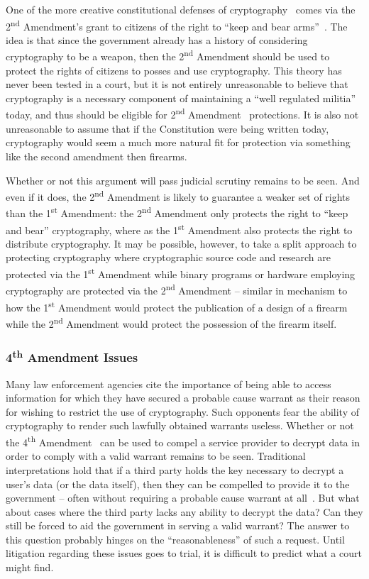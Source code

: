 One of the more creative constitutional defenses of
cryptography~\cite{xkcd-504} comes via the 2\textsuperscript{nd}
Amendment's grant to citizens of the right to ``keep and bear
arms''~\cite{us-constitution-amend2}. The idea is that since the
government already has a history of considering cryptography to be a
weapon, then the 2\textsuperscript{nd} Amendment should be used to
protect the rights of citizens to posses and use cryptography. This
theory has never been tested in a court, but it is not entirely
unreasonable to believe that cryptography is a necessary component of
maintaining a ``well regulated militia'' today, and thus should be
eligible for 2\textsuperscript{nd}
Amendment~\cite{scotus-usvmiller-guns} protections. It is also not
unreasonable to assume that if the Constitution were being written
today, cryptography would seem a much more natural fit for protection
via something like the second amendment then firearms.

Whether or not this argument will pass judicial scrutiny remains to be
seen. And even if it does, the 2\textsuperscript{nd} Amendment is
likely to guarantee a weaker set of rights than the
1\textsuperscript{st} Amendment: the 2\textsuperscript{nd} Amendment
only protects the right to ``keep and bear'' cryptography, where as
the 1\textsuperscript{st} Amendment also protects the right to
distribute cryptography. It may be possible, however, to take a split
approach to protecting cryptography where cryptographic source code
and research are protected via the 1\textsuperscript{st} Amendment
while binary programs or hardware employing cryptography are protected
via the 2\textsuperscript{nd} Amendment -- similar in mechanism to how
the 1\textsuperscript{st} Amendment would protect the publication of a
design of a firearm while the 2\textsuperscript{nd} Amendment would
protect the possession of the firearm itself.

\subsubsection{4\textsuperscript{th} Amendment Issues}

Many law enforcement agencies cite the importance of being able to
access information for which they have secured a probable cause
warrant as their reason for wishing to restrict the use of
cryptography. Such opponents fear the ability of cryptography to
render such lawfully obtained warrants useless. Whether or not the
4\textsuperscript{th} Amendment~\cite{us-constitution-amend4} can be
used to compel a service provider to decrypt data in order to comply
with a valid warrant remains to be seen. Traditional interpretations
hold that if a third party holds the key necessary to decrypt a user's
data (or the data itself), then they can be compelled to provide it to
the government -- often without requiring a probable cause warrant at
all~\cite{thompson-thirdparty}. But what about cases where the third
party lacks any ability to decrypt the data? Can they still be forced
to aid the government in serving a valid warrant?  The answer to this
question probably hinges on the ``reasonableness'' of such a
request. Until litigation regarding these issues goes to trial, it is
difficult to predict what a court might find.

